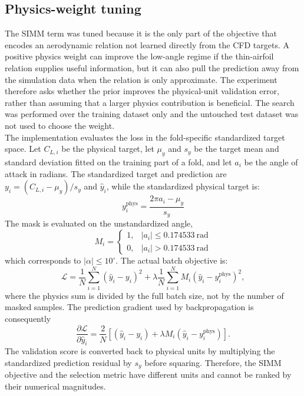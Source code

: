 \subsection{Physics-weight tuning}
\label{sec:04_physics_weight_tuning}

The SIMM term was tuned because it is the only part of the objective that encodes an aerodynamic relation not learned directly from the CFD targets. A positive physics weight can improve the low-angle regime if the thin-airfoil relation supplies useful information, but it can also pull the prediction away from the simulation data when the relation is only approximate. The experiment therefore asks whether the prior improves the physical-unit validation error, rather than assuming that a larger physics contribution is beneficial. The search was performed over the training dataset only and the untouched test dataset was not used to choose the weight.\\

The implementation evaluates the loss in the fold-specific standardized target space. Let $C_{L,i}$ be the physical target, let $\mu_y$ and $s_y$ be the target mean and standard deviation fitted on the training part of a fold, and let $a_i$ be the angle of attack in radians. The standardized target and prediction are $y_i=(C_{L,i}-\mu_y)/s_y$ and $\hat{y}_i$, while the standardized physical target is:
\begin{equation}
    y_i^{\mathrm{phys}}=\frac{2\pi a_i-\mu_y}{s_y}
    \label{eq:04_physics_target}
\end{equation}
The mask is evaluated on the unstandardized angle,
\begin{equation}
    M_i=\begin{cases}
        1, & |a_i|\leq 0.174533\ \mathrm{rad}\\
        0, & |a_i|>0.174533\ \mathrm{rad}
    \end{cases}
    \label{eq:04_physics_mask}
\end{equation}
which corresponds to $|\alpha|\leq10^\circ$. The actual batch objective is:
\begin{equation}
    \mathcal{L}=\frac{1}{N}\sum_{i=1}^{N}(\widehat{y}_i-y_i)^2
    +\lambda\frac{1}{N}\sum_{i=1}^{N}M_i
    (\widehat{y}_i-y_i^{\mathrm{phys}})^2,
    \label{eq:04_simm_loss}
\end{equation}
where the physics sum is divided by the full batch size, not by the number of masked samples. The prediction gradient used by backpropagation is consequently
\begin{equation}
    \frac{\partial\mathcal{L}}{\partial\widehat{y}_i}
    =\frac{2}{N}\left[(\widehat{y}_i-y_i)
    +\lambda M_i(\widehat{y}_i-y_i^{\mathrm{phys}})\right].
    \label{eq:04_physics_gradient}
\end{equation}
The validation score is converted back to physical units by multiplying the standardized prediction residual by $s_y$ before squaring. Therefore, the SIMM objective and the selection metric have different units and cannot be ranked by their numerical magnitudes.\\

